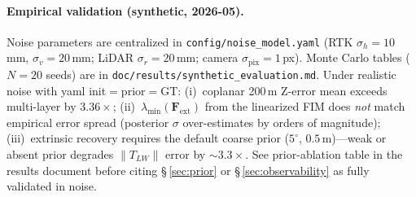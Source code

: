 \paragraph{Empirical validation (synthetic, 2026-05).}
Noise parameters are centralized in \texttt{config/noise\_model.yaml} (RTK $\sigma_h{=}10$\,mm, $\sigma_v{=}20$\,mm; LiDAR $\sigma_r{=}20$\,mm; camera $\sigma_{\mathrm{pix}}{=}1$\,px).
Monte Carlo tables ($N{=}20$ seeds) are in \texttt{doc/results/synthetic\_evaluation.md}.
Under realistic noise with yaml init${=}$prior${=}$GT:
(i)~coplanar 200\,m Z-error mean exceeds multi-layer by $3.36\times$;
(ii)~$\lambda_{\min}(\mathbf{F}_{\mathrm{ext}})$ from the linearized FIM does \emph{not} match empirical error spread (posterior $\sigma$ over-estimates by orders of magnitude);
(iii)~extrinsic recovery requires the default coarse prior ($5^\circ$, $0.5$\,m)---weak or absent prior degrades $\|T_{LW}\|$ error by $\sim\!3.3\times$.
See prior-ablation table in the results document before citing §\,\ref{sec:prior} or §\,\ref{sec:observability} as fully validated in noise.
